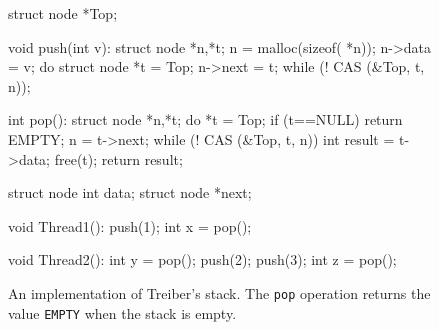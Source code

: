 \begin{figure}[t]
  \scriptsize
  \begin{minipage}[t]{41mm}
    \begin{program}
struct node *Top;      
      
void push(int v):
  struct node *n,*t;
  n = malloc(sizeof( *n));
  n->data = v;
  do {
    struct node *t = Top;
    n->next = t;
  } while (! CAS (&Top, t, n));
    \end{program}
  \end{minipage}
  \begin{minipage}[t]{40mm}
    \begin{program}
int pop():
  struct node *n,*t;
  do {
    *t = Top;
    if (t==NULL) return EMPTY;
    n = t->next;
  } while (! CAS (&Top, t, n))
  int result = t->data;
  free(t);
  return result;
    \end{program}
  \end{minipage}
  \begin{minipage}[t]{30mm}
    \begin{program}
struct node {
  int data;
  struct node *next;
}
    \end{program}
  \end{minipage}
  \begin{minipage}[t]{25mm}
    \begin{program}
void Thread1():
  push(1);
  int x = pop();
    \end{program}
  \end{minipage}
  \begin{minipage}[t]{25mm}
    \begin{program}
void Thread2():
  int y = pop();
  push(2);
  push(3);
  int z = pop();
    \end{program}
  \end{minipage}

  \caption{An implementation of Treiber's stack. The {\tt pop} operation
  returns the value {\tt EMPTY} when the stack is empty.}
  \label{fig:treiber}
\end{figure}

